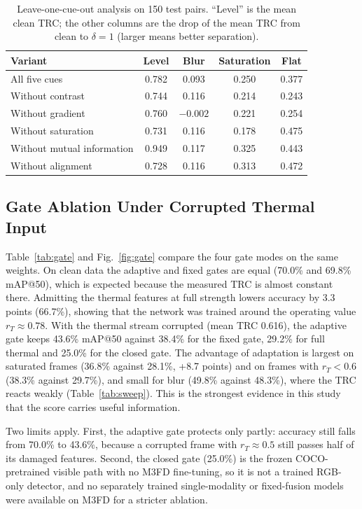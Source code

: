 \documentclass[journal]{IEEEtran}
\newcommand{\rT}{r_T}
\begin{document}
\begin{table}[!t]
\centering
\caption{Leave-one-cue-out analysis on 150 test pairs. ``Level'' is the mean clean TRC; the other columns are the drop of the mean TRC from clean to $\delta=1$ (larger means better separation).}
\label{tab:loo}
\footnotesize
\setlength{\tabcolsep}{4pt}
\begin{tabular}{@{}lcccc@{}}
\toprule
Variant & Level & Blur & Saturation & Flat \\
\midrule
All five cues & 0.782 & 0.093 & 0.250 & 0.377 \\
Without contrast & 0.744 & 0.116 & 0.214 & 0.243 \\
Without gradient & 0.760 & $-0.002$ & 0.221 & 0.254 \\
Without saturation & 0.731 & 0.116 & 0.178 & 0.475 \\
Without mutual information & 0.949 & 0.117 & 0.325 & 0.443 \\
Without alignment & 0.728 & 0.116 & 0.313 & 0.472 \\
\bottomrule
\end{tabular}
\end{table}

\subsection{Gate Ablation Under Corrupted Thermal Input}
Table~\ref{tab:gate} and Fig.~\ref{fig:gate} compare the four gate modes on the same weights. On clean data the adaptive and fixed gates are equal (70.0\% and 69.8\% mAP@50), which is expected because the measured TRC is almost constant there. Admitting the thermal features at full strength lowers accuracy by 3.3 points (66.7\%), showing that the network was trained around the operating value $\rT\approx0.78$. With the thermal stream corrupted (mean TRC 0.616), the adaptive gate keeps 43.6\% mAP@50 against 38.4\% for the fixed gate, 29.2\% for full thermal and 25.0\% for the closed gate. The advantage of adaptation is largest on saturated frames (36.8\% against 28.1\%, +8.7 points) and on frames with $\rT<0.6$ (38.3\% against 29.7\%), and small for blur (49.8\% against 48.3\%), where the TRC reacts weakly (Table~\ref{tab:sweep}). This is the strongest evidence in this study that the score carries useful information.

Two limits apply. First, the adaptive gate protects only partly: accuracy still falls from 70.0\% to 43.6\%, because a corrupted frame with $\rT\approx0.5$ still passes half of its damaged features. Second, the closed gate (25.0\%) is the frozen COCO-pretrained visible path with no M3FD fine-tuning, so it is not a trained RGB-only detector, and no separately trained single-modality or fixed-fusion models were available on M3FD for a stricter ablation.
\end{document}
